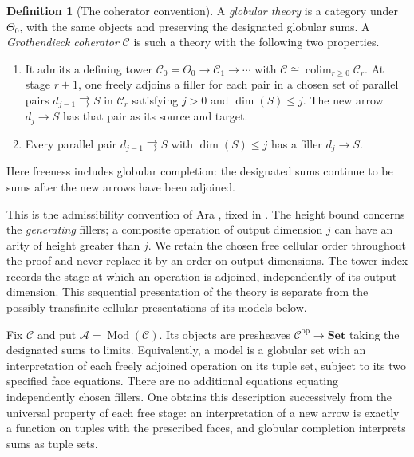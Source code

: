 \documentclass[11pt,letterpaper]{article}
\numberwithin{equation}{section}
\theoremstyle{plain}
\theoremstyle{definition}
\newtheorem{definition}[theorem]{Definition}
\theoremstyle{remark}
\begin{document}
\begin{definition}[The coherator convention]\label{def:coherator}
A \emph{globular theory} is a category under $\Theta_0$, with the same
objects and preserving the designated globular sums.  A
\emph{Grothendieck coherator} $\mathcal C$ is such a theory with the
following two properties.
\begin{enumerate}
\item It admits a defining tower
$\mathcal C_0=\Theta_0\to\mathcal C_1\to\cdots$ with
$\mathcal C\cong\operatorname{colim}_{r\ge0}\mathcal C_r$.  At stage $r+1$, one
freely adjoins a filler for each pair in a chosen set of parallel pairs
$d_{j-1}\rightrightarrows S$ in $\mathcal C_r$ satisfying
$j>0$ and $\dim(S)\le j$.  The new arrow $d_j\to S$ has that pair
as its source and target.
\item Every parallel pair $d_{j-1}\rightrightarrows S$ with
$\dim(S)\le j$ has a filler $d_j\to S$.
\end{enumerate}
Here freeness includes globular completion: the designated sums continue
to be sums after the new arrows have been adjoined.
\end{definition}

This is the admissibility convention of Ara
\cite[Sections~2.3 and 2.9--2.11]{Ara2013}, fixed in
\cite[Section~5.3]{Henry2016}.  The height bound concerns the
\emph{generating} fillers; a composite operation of output dimension $j$
can have an arity of height greater than $j$.  We retain the chosen free
cellular order throughout the proof and never replace it by an order on
output dimensions.  The tower index records the stage at which an
operation is adjoined, independently of its output dimension.  This
sequential presentation of the theory is separate from the possibly
transfinite cellular presentations of its models below.

Fix $\mathcal C$ and put $\mathcal A=\operatorname{Mod}(\mathcal C)$.  Its objects are
presheaves $\mathcal C^{\mathrm{op}}\to\mathbf{Set}$ taking the designated sums
to limits.  Equivalently, a model is a globular set with an interpretation
of each freely adjoined operation on its tuple set, subject to its two
specified face equations.  There are no additional equations equating
independently chosen fillers.  One obtains this description successively
from the universal property of each free stage: an interpretation of a
new arrow is exactly a function on tuples with the prescribed faces, and
globular completion interprets sums as tuple sets.
\end{document}
